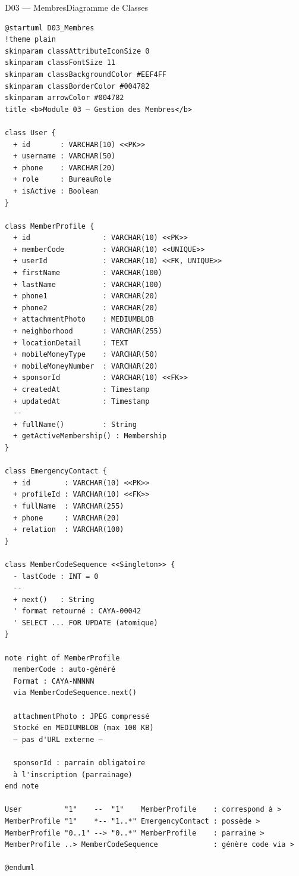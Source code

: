 \documentclass[12pt, a4paper]{report}
\begin{document}
\begin{diagramBox}{D03 — Membres}{Diagramme de Classes}
\begin{lstlisting}
@startuml D03_Membres
!theme plain
skinparam classAttributeIconSize 0
skinparam classFontSize 11
skinparam classBackgroundColor #EEF4FF
skinparam classBorderColor #004782
skinparam arrowColor #004782
title <b>Module 03 — Gestion des Membres</b>

class User {
  + id       : VARCHAR(10) <<PK>>
  + username : VARCHAR(50)
  + phone    : VARCHAR(20)
  + role     : BureauRole
  + isActive : Boolean
}

class MemberProfile {
  + id                 : VARCHAR(10) <<PK>>
  + memberCode         : VARCHAR(10) <<UNIQUE>>
  + userId             : VARCHAR(10) <<FK, UNIQUE>>
  + firstName          : VARCHAR(100)
  + lastName           : VARCHAR(100)
  + phone1             : VARCHAR(20)
  + phone2             : VARCHAR(20)
  + attachmentPhoto    : MEDIUMBLOB
  + neighborhood       : VARCHAR(255)
  + locationDetail     : TEXT
  + mobileMoneyType    : VARCHAR(50)
  + mobileMoneyNumber  : VARCHAR(20)
  + sponsorId          : VARCHAR(10) <<FK>>
  + createdAt          : Timestamp
  + updatedAt          : Timestamp
  --
  + fullName()         : String
  + getActiveMembership() : Membership
}

class EmergencyContact {
  + id        : VARCHAR(10) <<PK>>
  + profileId : VARCHAR(10) <<FK>>
  + fullName  : VARCHAR(255)
  + phone     : VARCHAR(20)
  + relation  : VARCHAR(100)
}

class MemberCodeSequence <<Singleton>> {
  - lastCode : INT = 0
  --
  + next()   : String
  ' format retourné : CAYA-00042
  ' SELECT ... FOR UPDATE (atomique)
}

note right of MemberProfile
  memberCode : auto-généré
  Format : CAYA-NNNNN
  via MemberCodeSequence.next()

  attachmentPhoto : JPEG compressé
  Stocké en MEDIUMBLOB (max 100 KB)
  — pas d'URL externe —

  sponsorId : parrain obligatoire
  à l'inscription (parrainage)
end note

User          "1"    --  "1"    MemberProfile    : correspond à >
MemberProfile "1"    *-- "1..*" EmergencyContact : possède >
MemberProfile "0..1" --> "0..*" MemberProfile    : parraine >
MemberProfile ..> MemberCodeSequence             : génère code via >

@enduml
\end{lstlisting}
\end{diagramBox}
\end{document}
